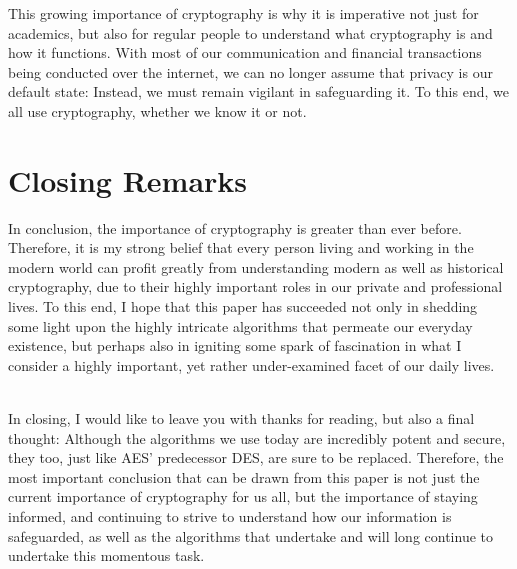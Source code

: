 \documentclass[12pt, a4paper]{report}
\theoremstyle{definition}
\theoremstyle{remark}
\begin{document}
This growing importance of cryptography is why it is imperative not just for academics, but also for regular people to understand what cryptography is and how it functions. With most of our communication and financial transactions being conducted over the internet, we can no longer assume that privacy is our default state: Instead, we must remain vigilant in safeguarding it. To this end, we all use cryptography, whether we know it or not.

\section{Closing Remarks}
In conclusion, the importance of cryptography is greater than ever before. Therefore, it is my strong belief that every person living and working in the modern world can profit greatly from understanding modern as well as historical cryptography, due to their highly important roles in our private and professional lives. To this end, I hope that this paper has succeeded not only in shedding some light upon the highly intricate algorithms that permeate our everyday existence, but perhaps also in igniting some spark of fascination in what I consider a highly important, yet rather under-examined facet of our daily lives.

\hfill \\

In closing, I would like to leave you with thanks for reading, but also a final thought: Although the algorithms we use today are incredibly potent and secure, they too, just like AES' predecessor DES, are sure to be replaced. Therefore, the most important conclusion that can be drawn from this paper is not just the current importance of cryptography for us all, but the importance of staying informed, and continuing to strive to understand how our information is safeguarded, as well as the algorithms that undertake and will long continue to undertake this momentous task.

\bibhang=0pt
\printbibliography
\end{document}
